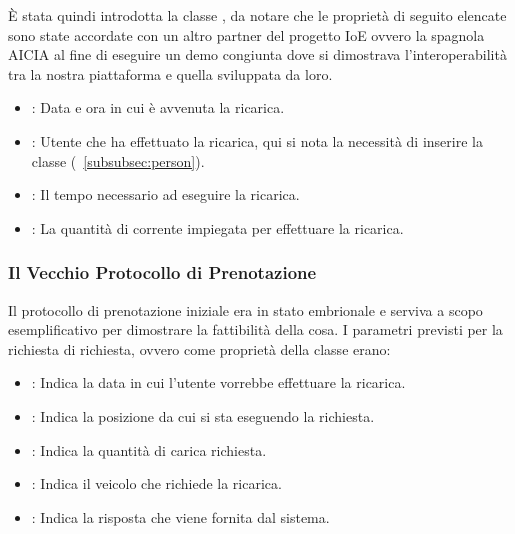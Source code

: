 
È stata quindi introdotta la classe , da notare che le proprietà di seguito elencate sono state accordate con un altro partner del progetto IoE ovvero la spagnola AICIA al fine di eseguire un demo congiunta dove si dimostrava l'interoperabilità tra la nostra piattaforma e quella sviluppata da loro.

\begin{itemize}
	\item {}: Data e ora in cui è avvenuta la ricarica.
	\item {}: Utente che ha effettuato la ricarica, qui si nota la necessità di inserire la classe  (~\ref{subsubsec:person}).
	\item {}: Il tempo necessario ad eseguire la ricarica.
	\item {}: La quantità di corrente impiegata per effettuare la ricarica.
\end{itemize}

\subsubsection{Il Vecchio Protocollo di Prenotazione}\label{subsubsec:old-proto}

Il protocollo di prenotazione iniziale era in stato embrionale e serviva a scopo esemplificativo per dimostrare la fattibilità della cosa. I parametri previsti per la richiesta di richiesta, ovvero come proprietà della classe  erano:

\begin{itemize}
	\item {}: Indica la data in cui l'utente vorrebbe effettuare la ricarica.
	\item {}: Indica la posizione da cui si sta eseguendo la richiesta.
	\item {}: Indica la quantità di carica richiesta. 
	\item {}: Indica il veicolo che richiede la ricarica.
	\item {}: Indica la risposta che viene fornita dal sistema.
\end{itemize}

